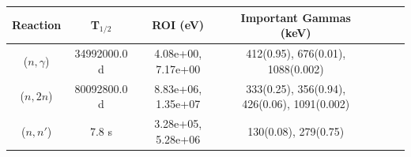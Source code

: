 \begin{figure}[!ht]
   \centering
   \quad
   \\ 
   \quad 
   \\ 

\end{figure}

\begin{table}[h]
\centering
\begin{tabular}{ |c|c|c|c|c|c|c| }
 \hline
 Reaction & T$_{1/2}$ & ROI (eV) & Important Gammas (keV) \\
 \hline 
 ($n,\gamma$) & 34992000.0 d & 4.08e+00, 7.17e+00 & 412(0.95), 676(0.01), 1088(0.002) \\ 
\hline
 ($n,2n$) & 80092800.0 d & 8.83e+06, 1.35e+07 & 333(0.25), 356(0.94), 426(0.06), 1091(0.002) \\ 
\hline
 ($n,n'$) &  7.8 s & 3.28e+05, 5.28e+06 & 130(0.08), 279(0.75) \\ 
\hline
\end{tabular}
\end{table}
